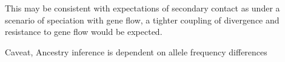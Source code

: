 This may be consistent with expectations of secondary contact as under a scenario
of speciation with gene flow, a tighter coupling of divergence and resistance 
to gene flow would be expected.

Caveat, Ancestry inference is dependent on allele frequency differences \parencite{gompert2017}











